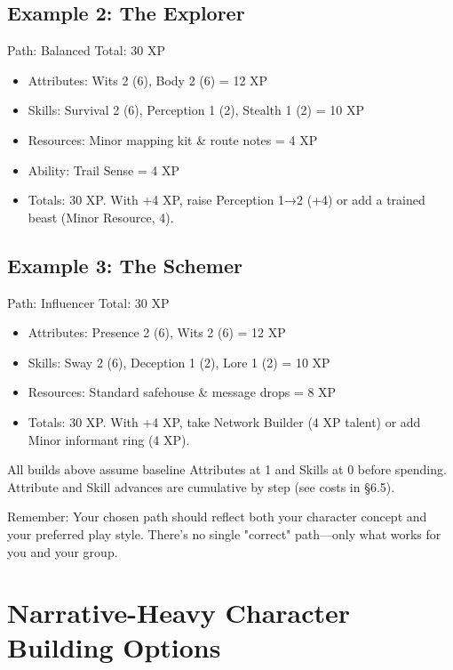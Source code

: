 \documentclass[11pt,twoside,openany]{book}
\begin{document}
\subsection*{Example 2: The Explorer}

Path: Balanced \hfill Total: 30 XP

\begin{itemize}
\item Attributes: Wits 2 (6), Body 2 (6) = 12 XP
\item Skills: Survival 2 (6), Perception 1 (2), Stealth 1 (2) = 10 XP
\item Resources: Minor mapping kit \& route notes = 4 XP
\item Ability: Trail Sense = 4 XP
\item Totals: 30 XP. With +4 XP, raise Perception 1→2 (+4) or add a trained beast (Minor Resource, 4).
\end{itemize}

\subsection*{Example 3: The Schemer}

Path: Influencer \hfill Total: 30 XP

\begin{itemize}
\item Attributes: Presence 2 (6), Wits 2 (6) = 12 XP
\item Skills: Sway 2 (6), Deception 1 (2), Lore 1 (2) = 10 XP
\item Resources: Standard safehouse \& message drops = 8 XP
\item Totals: 30 XP. With +4 XP, take Network Builder (4 XP talent) or add Minor informant ring (4 XP).
\end{itemize}

\begin{tcolorbox}[colback=gray!5!white, colframe=gray!75!black, title=Reminder, fonttitle=\bfseries]
All builds above assume baseline Attributes at 1 and Skills at 0 before spending. Attribute and Skill advances are cumulative by step (see costs in §6.5).

Remember: Your chosen path should reflect both your character concept and your preferred play style. There's no single "correct" path—only what works for you and your group.
\end{tcolorbox}

\section*{Narrative-Heavy Character Building Options} 
\end{document}
